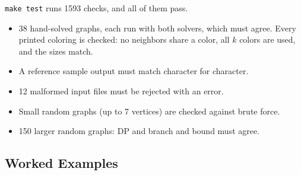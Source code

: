 \documentclass[11pt]{article}
\begin{document}
\texttt{make test} runs 1593 checks, and all of them pass.
\begin{itemize}
  \item 38 hand-solved graphs, each run with both solvers, which must agree.
        Every printed coloring is checked: no neighbors share a color, all
        $k$ colors are used, and the sizes match.
  \item A reference sample output must match character for character.
  \item 12 malformed input files must be rejected with an error.
  \item Small random graphs (up to 7 vertices) are checked against brute force.
  \item 150 larger random graphs: DP and branch and bound must agree.
\end{itemize}

\subsection{Worked Examples}
\end{document}
